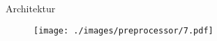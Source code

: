 \begin{frame}{Architektur}
    \begin{figure}
    	\centering
    	\texttt{[image: ./images/preprocessor/7.pdf]}
    \end{figure}
\end{frame}
